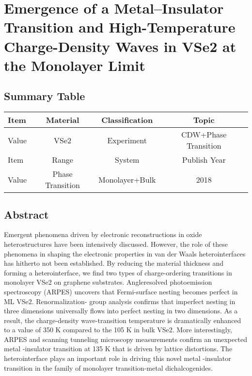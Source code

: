 \setchapterpreamble[u]{\margintoc}
\chapter{Emergence of a Metal–Insulator Transition and High-Temperature Charge-Density Waves in VSe2 at the Monolayer Limit\cite{doi:10.1021/acs.nanolett.8b01764}}

\section{Summary Table}

\begin{table}[h]
    \begin{tabular}{lccc}
    \hline
    Item  & Material         & Classification & Topic        \\  \hline
    Value & VSe2             & Experiment     & CDW+Phase Transition \\  \hline
    Item  & Range            & System         & Publish Year \\  \hline
    Value & Phase Transition & Monolayer+Bulk & 2018         \\  \hline
    \end{tabular}
\end{table}

\section{Abstract}
Emergent phenomena driven by electronic reconstructions in oxide heterostructures have been intensively discussed. However, the role of these phenomena in shaping the electronic properties in van der Waals heterointerfaces has hitherto not been established. By reducing the material thickness and forming a heterointerface, we find two types of charge-ordering transitions in monolayer VSe2 on graphene substrates. Angleresolved photoemission spectroscopy (ARPES) uncovers that Fermi-surface nesting becomes perfect in ML VSe2. Renormalization- group analysis confirms that imperfect nesting in three dimensions universally flows into perfect nesting in two dimensions. As a result, the charge-density wave-transition temperature is dramatically enhanced to a value of 350 K compared to the 105 K in bulk VSe2. More interestingly, ARPES and scanning tunneling microscopy measurements confirm an unexpected metal -insulator transition at 135 K that is driven by lattice distortions. The heterointerface plays an important role in driving this novel metal -insulator transition in the family of monolayer transition-metal dichalcogenides. 

